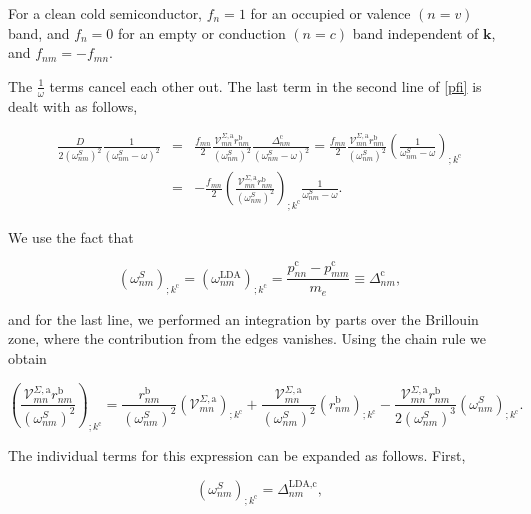 \documentclass[11pt]{article}
\begin{document}
For a clean cold semiconductor, $f_{n} = 1$ for an occupied or valence $(n = v)$ band, and $f_{n} = 0$ for an empty or conduction $(n = c)$ band independent of $\mathbf{k}$, and $f_{nm}=-f_{mn}$.

The $\frac{1}{\omega}$ terms cancel each other out. The last term in the second line of \eqref{pfi} is dealt with as follows,

\begin{eqnarray}\label{dresn}
\frac{D}{2(\omega^S_{nm})^2}\frac{1}{(\omega^S_{nm}-\omega)^2} 
&=& \frac{f_{mn}}{2}\frac{\mathcal{V}^{\Sigma,\text{a}}_{mn}r^{\text{b}}_{nm}}{(\omega^S_{nm})^2}\frac{\Delta^{\text{c}}_{nm}}{(\omega^S_{nm}-\omega)^2} = \frac{f_{mn}}{2}\frac{\mathcal{V}^{\Sigma,\text{a}}_{mn}r^{\text{b}}_{nm}}{(\omega^S_{nm})^2}\left(\frac{1}{\omega^S_{nm}-\omega}\right)_{;k^{\text{c}}}\nonumber\\
&=& -\frac{f_{mn}}{2}\left(\frac{\mathcal{V}^{\Sigma,\text{a}}_{mn}r^{\text{b}}_{nm}}{(\omega^S_{nm})^2}\right)_{;k^{\text{c}}}\frac{1}{\omega^S_{nm}-\omega}.
\end{eqnarray} 

We use the fact that

\begin{equation}\label{wk}
(\omega^S_{nm})_{;k^{\text{c}}}=(\omega^\text{LDA}_{nm})_{;k^{\text{c}}} = \frac{p_{nn}^{\text{c}}-p_{mm}^{\text{c}}}{m_{e}} \equiv \Delta_{nm}^{\text{c}},
\end{equation}

and for the last line, we performed an integration by parts over the Brillouin zone, where the contribution from the edges vanishes. Using the chain rule we obtain

\begin{equation}\label{chrn}
\left(\frac{\mathcal{V}^{\Sigma,\text{a}}_{mn}r^{\text{b}}_{nm}}{(\omega^S_{nm})^2}\right)_{;k^{\text{c}}} = \frac{r^{\text{b}}_{nm}}{(\omega^S_{nm})^2}\left(\mathcal{V} ^{\Sigma,\text{a}}_{mn}\right)_{;k^{\text{c}}} + \frac{\mathcal{V}^{\Sigma,\text{a}}_{mn}}{(\omega^S_{nm})^2}\left(r^{\text{b}}_{nm}\right)_{;k^{\text{c}}} - \frac{\mathcal{V}^{\Sigma,\text{a}}_{mn}r^{\text{b}}_{nm}}{2(\omega^S_{nm})^3}\left(\omega^S_{nm}\right)_{;k^{\text{c}}}.
\end{equation}

The individual terms for this expression can be expanded as follows. First,

\begin{equation}\label{eli.1}
\left(\omega^S_{nm}\right)_{;k^{\text{c}}} = \Delta^{\text{LDA},\text{c}}_{nm},
\end{equation}
\end{document}
